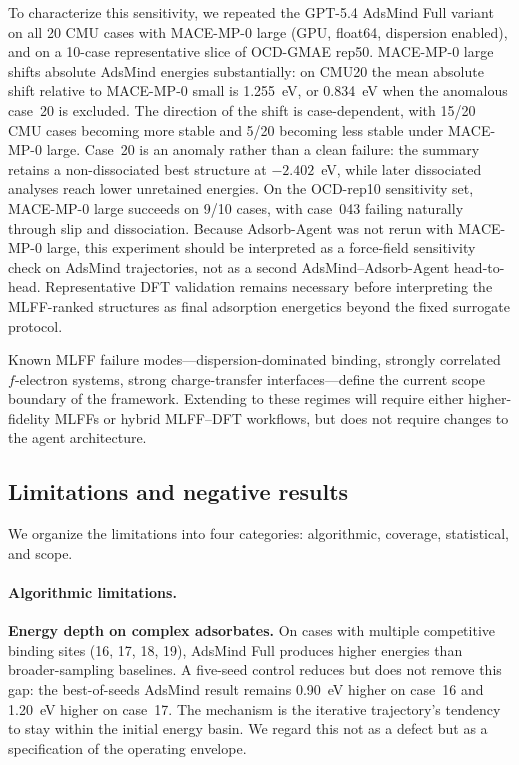 To characterize this sensitivity, we repeated the GPT-5.4 AdsMind Full variant on all 20 CMU cases with MACE-MP-0 large (GPU, float64, dispersion enabled), and on a 10-case representative slice of OCD-GMAE rep50.
MACE-MP-0 large shifts absolute AdsMind energies substantially: on CMU20 the mean absolute shift relative to MACE-MP-0 small is 1.255~eV, or 0.834~eV when the anomalous case~20 is excluded.
The direction of the shift is case-dependent, with 15/20 CMU cases becoming more stable and 5/20 becoming less stable under MACE-MP-0 large.
Case~20 is an anomaly rather than a clean failure: the summary retains a non-dissociated best structure at $-2.402$~eV, while later dissociated analyses reach lower unretained energies.
On the OCD-rep10 sensitivity set, MACE-MP-0 large succeeds on 9/10 cases, with case~043 failing naturally through slip and dissociation.
Because Adsorb-Agent was not rerun with MACE-MP-0 large, this experiment should be interpreted as a force-field sensitivity check on AdsMind trajectories, not as a second AdsMind--Adsorb-Agent head-to-head.
Representative DFT validation remains necessary before interpreting the MLFF-ranked structures as final adsorption energetics beyond the fixed surrogate protocol.

Known MLFF failure modes---dispersion-dominated binding, strongly correlated $f$-electron systems, strong charge-transfer interfaces---define the current scope boundary of the framework.
Extending to these regimes will require either higher-fidelity MLFFs or hybrid MLFF--DFT workflows, but does not require changes to the agent architecture.

\subsection{Limitations and negative results}

We organize the limitations into four categories: algorithmic, coverage, statistical, and scope.

\paragraph{Algorithmic limitations.}
\textbf{Energy depth on complex adsorbates.}
On cases with multiple competitive binding sites (16, 17, 18, 19), AdsMind Full produces higher energies than broader-sampling baselines.
A five-seed control reduces but does not remove this gap: the best-of-seeds AdsMind result remains 0.90~eV higher on case~16 and 1.20~eV higher on case~17.
The mechanism is the iterative trajectory's tendency to stay within the initial energy basin.
We regard this not as a defect but as a specification of the operating envelope.

